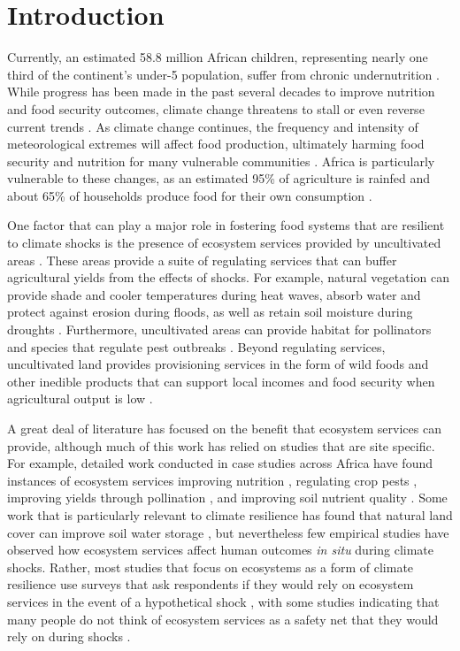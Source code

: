 \documentclass{article}
\begin{document}
\section{Introduction}

Currently, an estimated 58.8 million African children, representing nearly one third of the continent's under-5 population, suffer from chronic undernutrition \cite{unicef2019}.  While progress has been made in the past several decades to improve nutrition and food security outcomes, climate change threatens to stall or even reverse current trends \cite{FAO2018}.  As climate change continues, the frequency and intensity of meteorological extremes will affect food production, ultimately harming food security and nutrition for many vulnerable communities \cite{niles2020climate}.  Africa is particularly vulnerable to these changes, as an estimated 95\% of agriculture is rainfed \cite{Wani2009} and about 65\% of households produce food for their own consumption \cite{Runge2004}.

One factor that can play a major role in fostering food systems that are resilient to climate shocks is the presence of ecosystem services provided by uncultivated areas \cite{Reed2016, Pascual2017, Daily2008}.  These areas provide a suite of regulating services that can buffer agricultural yields from the effects of shocks.  For example, natural vegetation can provide shade and cooler temperatures during heat waves, absorb water and protect against erosion during floods, as well as retain soil moisture during droughts \cite{Siriri2013, Lott2009}.  Furthermore, uncultivated areas can provide habitat for pollinators and species that regulate pest outbreaks \cite{Karp2013}.  Beyond regulating services, uncultivated land provides provisioning services in the form of wild foods and other inedible products that can support local incomes and food security when agricultural output is low \cite{friant2019life, morgan2020secret, powell2015improving, Assogbadjo2012}.

A great deal of literature has focused on the benefit that ecosystem services can provide, although much of this work has relied on studies that are site specific.  For example, detailed work conducted in case studies across Africa have found instances of ecosystem services improving nutrition \cite{Golden2011}, regulating crop pests \cite{Girma2000}, improving yields through pollination \cite{Gemmill-Herren2008, Munyuli2012}, and improving soil nutrient quality \cite{Sileshi2012, Boffa2000, Siriri2009}.  Some work that is particularly relevant to climate resilience has found that natural land cover can improve soil water storage \cite{Siriri2013, Lott2009}, but nevertheless few empirical studies have observed how ecosystem services affect human outcomes \textit{in situ} during climate shocks.  Rather, most studies that focus on ecosystems as a form of climate resilience use surveys that ask respondents if they would rely on ecosystem services in the event of a hypothetical shock \cite{Robledo2012}, with some studies indicating that many people do not think of ecosystem services as a safety net that they would rely on during shocks \cite{Wunder2014}.
\end{document}
